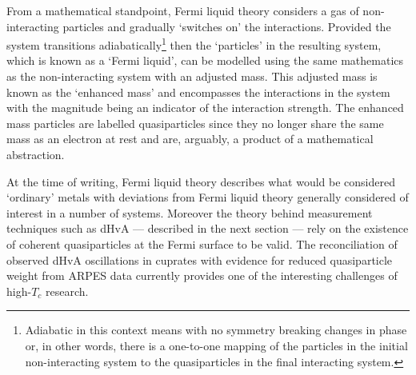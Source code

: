 From a mathematical standpoint, Fermi liquid theory considers a gas of non-interacting particles and gradually `switches on' the interactions. Provided the system transitions adiabatically\footnote{Adiabatic in this context means with no symmetry breaking changes in phase or, in other words, there is a one-to-one mapping of the particles in the initial non-interacting system to the quasiparticles in the final interacting system.} then the `particles' in the resulting system, which is known as a `Fermi liquid', can be modelled using the same mathematics as the non-interacting system with an adjusted mass. This adjusted mass is known as the `enhanced mass' and encompasses the interactions in the system with the magnitude being an indicator of the interaction strength. The enhanced mass particles are labelled quasiparticles since they no longer share the same mass as an electron at rest and are, arguably, a product of a mathematical abstraction.

At the time of writing, Fermi liquid theory describes what would be considered `ordinary' metals with deviations from Fermi liquid theory generally considered of interest in a number of systems. Moreover the theory behind measurement techniques such as \ac{dHvA} --- described in the next section --- rely on the existence of coherent quasiparticles at the Fermi surface to be valid. The reconciliation of observed \ac{dHvA} oscillations in cuprates with evidence for reduced quasiparticle weight from \ac{ARPES} data currently provides one of the interesting challenges of high-$T_c$ research.

